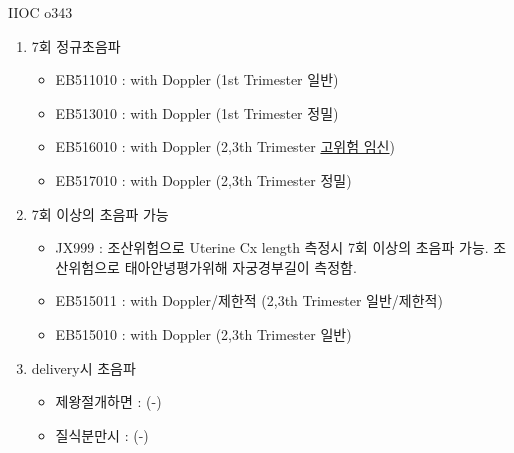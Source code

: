 \begin{commentbox}{IIOC o343}
\begin{enumerate}\tightlist
\item 7회 정규초음파
	\begin{itemize}\tightlist
	\item EB511010 : with Doppler (1st Trimester 일반) 
	\item EB513010 : with Doppler (1st Trimester 정밀) 
	\item EB516010 : with Doppler (2,3th Trimester \uline{고위험 임신}) 
	\item EB517010 : with Doppler (2,3th Trimester 정밀) 
	\end{itemize}
\item 7회 이상의 초음파 가능
	\begin{itemize}\tightlist
	\item JX999 : 조산위험으로 Uterine Cx length 측정시 7회 이상의 초음파 가능. 조산위험으로 태아안녕평가위해 자궁경부길이 측정함.
	\item EB515011 : with Doppler/제한적 (2,3th Trimester 일반/제한적)
	\item EB515010 : with Doppler (2,3th Trimester 일반)
	\end{itemize}	
\item delivery시 초음파
	\begin{itemize}\tightlist
	\item 제왕절개하면 : (-)
	\item 질식분만시 : (-)
	\end{itemize}
\end{enumerate}
\end{commentbox}
\clearpage
